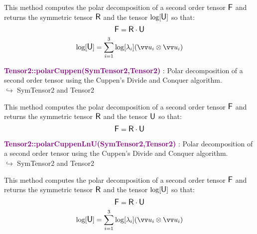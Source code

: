 This method computes the polar decomposition of a second order tensor $\mbox{\large\ensuremath{\mathsf{F}}}$ and returns the symmetric tensor $\mbox{\large\ensuremath{\mathsf{R}}}$ and the tensor $\log[\mbox{\large\ensuremath{\mathsf{U}}}]$ so that:
\begin{equation*}
\mbox{\large\ensuremath{\mathsf{F}}} = \mbox{\large\ensuremath{\mathsf{R}}} \cdot \mbox{\large\ensuremath{\mathsf{U}}}
\end{equation*}
\begin{equation*}
\log [\U] =\sum _{i=1}^{3}\log[\lambda_{i}](\overrightarrow{u}_{i}\otimes \overrightarrow{u}_{i})
\end{equation*}

\textcolor{purple}{\textbf{Tensor2::polarCuppen(SymTensor2,Tensor2)}}\label{Tensor2::polarCuppen(SymTensor2,Tensor2)} : Polar decomposition of a second order tensor using the Cuppen’s Divide and Conquer algorithm.\\ \hspace*{5mm}$\hookrightarrow$ SymTensor2 and Tensor2

This method computes the polar decomposition of a second order tensor $\mbox{\large\ensuremath{\mathsf{F}}}$ and returns the symmetric tensor $\mbox{\large\ensuremath{\mathsf{R}}}$ and the tensor $\mbox{\large\ensuremath{\mathsf{U}}}$ so that:
\begin{equation*}
\mbox{\large\ensuremath{\mathsf{F}}} = \mbox{\large\ensuremath{\mathsf{R}}} \cdot \mbox{\large\ensuremath{\mathsf{U}}}
\end{equation*}

\textcolor{purple}{\textbf{Tensor2::polarCuppenLnU(SymTensor2,Tensor2)}}\label{Tensor2::polarCuppenLnU(SymTensor2,Tensor2)} : Polar decomposition of a second order tensor using the Cuppen’s Divide and Conquer algorithm.\\ \hspace*{5mm}$\hookrightarrow$ SymTensor2 and Tensor2

This method computes the polar decomposition of a second order tensor $\mbox{\large\ensuremath{\mathsf{F}}}$ and returns the symmetric tensor $\mbox{\large\ensuremath{\mathsf{R}}}$ and the tensor $\log[\mbox{\large\ensuremath{\mathsf{U}}}]$ so that:
\begin{equation*}
\mbox{\large\ensuremath{\mathsf{F}}} = \mbox{\large\ensuremath{\mathsf{R}}} \cdot \mbox{\large\ensuremath{\mathsf{U}}}
\end{equation*}
\begin{equation*}
\log [\U] =\sum _{i=1}^{3}\log[\lambda_{i}](\overrightarrow{u}_{i}\otimes \overrightarrow{u}_{i})
\end{equation*}

